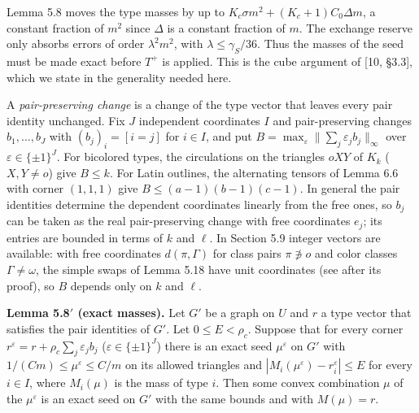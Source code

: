 \documentclass[english,11pt,a4paper]{article}
\begin{document}
Lemma 5.8 moves the type masses by up to \(K_c\sigma m^2+(K_c+1)C_0\Delta m\), a constant fraction of \(m^2\) since \(\Delta\) is a constant fraction of \(m\). The exchange reserve only absorbs errors of order \(\lambda^2m^2\), with \(\lambda\le\gamma_S/36\). Thus the masses of the seed must be made exact before \(T^+\) is applied. This is the cube argument of {[}10, §3.3{]}, which we state in the generality needed here.

A \emph{pair-preserving change} is a change of the type vector that leaves every pair identity unchanged. Fix \(J\) independent coordinates \(I\) and pair-preserving changes \(b_1,\dots,b_J\) with \((b_j)_i=[i=j]\) for \(i\in I\), and put \(B=\max_\varepsilon\|\sum_j\varepsilon_jb_j\|_\infty\) over \(\varepsilon\in\{\pm1\}^J\). For bicolored types, the circulations on the triangles \(oXY\) of \(K_k\) (\(X,Y\ne o\)) give \(B\le k\). For Latin outlines, the alternating tensors of Lemma 6.6 with corner \((1,1,1)\) give \(B\le(a-1)(b-1)(c-1)\). In general the pair identities determine the dependent coordinates linearly from the free ones, so \(b_j\) can be taken as the real pair-preserving change with free coordinates \(e_j\); its entries are bounded in terms of \(k\) and \(\ell\). In Section 5.9 integer vectors are available: with free coordinates \(d(\pi,\Gamma)\) for class pairs \(\pi\not\ni o\) and color classes \(\Gamma\ne\omega\), the simple swaps of Lemma 5.18 have unit coordinates (see after its proof), so \(B\) depends only on \(k\) and \(\ell\).

\textbf{Lemma 5.8\('\) (exact masses).} Let \(G'\) be a graph on \(U\) and \(r\) a type vector that satisfies the pair identities of \(G'\). Let \(0\le E<\rho_c\). Suppose that for every corner \(r^\varepsilon=r+\rho_c\sum_j\varepsilon_jb_j\) (\(\varepsilon\in\{\pm1\}^J\)) there is an exact seed \(\mu^\varepsilon\) on \(G'\) with \(1/(Cm)\le\mu^\varepsilon\le C/m\) on its allowed triangles and \(|M_i(\mu^\varepsilon)-r^\varepsilon_i|\le E\) for every \(i\in I\), where \(M_i(\mu)\) is the mass of type \(i\). Then some convex combination \(\mu\) of the \(\mu^\varepsilon\) is an exact seed on \(G'\) with the same bounds and with \(M(\mu)=r\).
\end{document}
